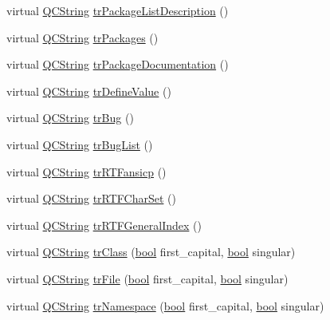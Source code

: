 \begin{DoxyCompactItemize}
\item 
virtual \hyperlink{class_q_c_string}{Q\+C\+String} \hyperlink{class_translator_polish_afbbf97c720f6ffabd1beeebb00ec2433}{tr\+Package\+List\+Description} ()
\item 
virtual \hyperlink{class_q_c_string}{Q\+C\+String} \hyperlink{class_translator_polish_ace2118b22aaf21ebe135338d8b2b0b5e}{tr\+Packages} ()
\item 
virtual \hyperlink{class_q_c_string}{Q\+C\+String} \hyperlink{class_translator_polish_a2dd2abf2c2de10ab4169db92372d8237}{tr\+Package\+Documentation} ()
\item 
virtual \hyperlink{class_q_c_string}{Q\+C\+String} \hyperlink{class_translator_polish_ae13b5d65dbff36936d3acc4a07adb90a}{tr\+Define\+Value} ()
\item 
virtual \hyperlink{class_q_c_string}{Q\+C\+String} \hyperlink{class_translator_polish_aa91f8e15b22436ae26172dbe68a6adf8}{tr\+Bug} ()
\item 
virtual \hyperlink{class_q_c_string}{Q\+C\+String} \hyperlink{class_translator_polish_a20de56dd770718181b091c4158bf0657}{tr\+Bug\+List} ()
\item 
virtual \hyperlink{class_q_c_string}{Q\+C\+String} \hyperlink{class_translator_polish_a03cafa9e4c4b5c191d1e52c81862235f}{tr\+R\+T\+Fansicp} ()
\item 
virtual \hyperlink{class_q_c_string}{Q\+C\+String} \hyperlink{class_translator_polish_a88a1c426ffc799dd4217c52dfb7f8170}{tr\+R\+T\+F\+Char\+Set} ()
\item 
virtual \hyperlink{class_q_c_string}{Q\+C\+String} \hyperlink{class_translator_polish_a0f9d8838e315e50c6d7c0eaa2ac6b6eb}{tr\+R\+T\+F\+General\+Index} ()
\item 
virtual \hyperlink{class_q_c_string}{Q\+C\+String} \hyperlink{class_translator_polish_a0ee6755e5fb669d0b2e6676415a5bed0}{tr\+Class} (\hyperlink{qglobal_8h_a1062901a7428fdd9c7f180f5e01ea056}{bool} first\+\_\+capital, \hyperlink{qglobal_8h_a1062901a7428fdd9c7f180f5e01ea056}{bool} singular)
\item 
virtual \hyperlink{class_q_c_string}{Q\+C\+String} \hyperlink{class_translator_polish_a0a1dab2f81c3273ed3b0970844ce977a}{tr\+File} (\hyperlink{qglobal_8h_a1062901a7428fdd9c7f180f5e01ea056}{bool} first\+\_\+capital, \hyperlink{qglobal_8h_a1062901a7428fdd9c7f180f5e01ea056}{bool} singular)
\item 
virtual \hyperlink{class_q_c_string}{Q\+C\+String} \hyperlink{class_translator_polish_ab1170336b09d8143cc0391cf2f66de6e}{tr\+Namespace} (\hyperlink{qglobal_8h_a1062901a7428fdd9c7f180f5e01ea056}{bool} first\+\_\+capital, \hyperlink{qglobal_8h_a1062901a7428fdd9c7f180f5e01ea056}{bool} singular)

\end{DoxyCompactItemize}
